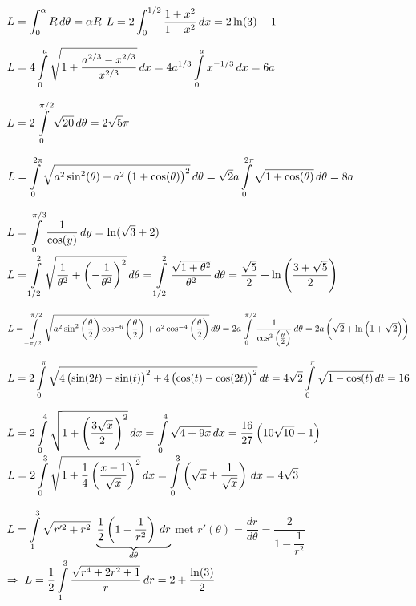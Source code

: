 \begin{Answer}
    
    \ifcalculus
    \Question $L = \displaystyle\int_0^{\alpha}R\,d\theta = \alpha R$ 
    \Question $L = \displaystyle 2\int_0^{1/2} \dfrac{1+x^2}{1-x^2}\, dx = 2\ln(3)-1$ 
    \fi
    
    \Question $L= 4 \displaystyle \int\limits_{0}^{a} \sqrt{1+ \dfrac{a^{2/3}-x^{2/3}}{x^{2/3}}} \, dx = 4a^{1/3} \displaystyle \int\limits_{0}^{a} x^{-1/3} \, dx   = 6a$
    
    \ifanalysis 
    \Question $L = 2 \displaystyle \int\limits_{0}^{\pi/2} \sqrt{20}\, d \theta = 2 \sqrt{5} \pi$ 
    \fi
    
    \Question $L = \displaystyle \int\limits_{0}^{2\pi} \sqrt{a^2 \sin^2 (\theta) + a^2 \left( 1+\cos(\theta) \right)^2}\, d \theta  = \sqrt{2} a \displaystyle \int\limits_{0}^{2 \pi} \sqrt{1+\cos(\theta)}\, d \theta= 8a $
    
    \Question  $L=\displaystyle \int\limits_{0}^{\pi/3} \dfrac{1}{\cos (y)} \, dy = \ln (\sqrt{3}+2)$
    \Question $L = \displaystyle \int \limits_{1/2}^2\sqrt{\dfrac{1}{\theta^2} + \left(-\dfrac{1}{\theta^2} \right)^2} \, d\theta  = \displaystyle \int \limits_{1/2}^2 \dfrac{\sqrt{1+\theta^2 }}{\theta^2}\, d\theta = \dfrac{\sqrt{5}}{2} + \ln  \left (\dfrac{3 + \sqrt{5}}{2} \right )$
    
    \ifanalysis
    \Question $L = \displaystyle \int\limits_{-\pi/2}^{\pi/2} \sqrt{a^2\sin^2\left(\frac{\theta}{2} \right) \cos^{-6}\left(\frac{\theta}{2} \right) + a^2 \cos^{-4}\left(\frac{\theta}{2} \right)}\, d \theta  = 2a \displaystyle \int\limits_{0}^{\pi/2} \dfrac{1}{\cos^3\left(\frac{\theta}{2} \right)}\, d \theta = 2 a \left(\sqrt{2} + \ln  \left(1 + \sqrt{2}\right)\right)  $
    \fi
    
    \Question $L= 2 \displaystyle \int\limits_{0}^{\pi} \sqrt{4 \left( \sin(2t)-\sin(t) \right)^2 + 4 \left( \cos(t)-\cos(2t) \right)^2} \, dt  = 4 \sqrt{2}\displaystyle \int\limits_{0}^{\pi} \sqrt{1-\cos (t)} \, dt = 16$
    
    \Question $L= 2 \displaystyle \int\limits_{0}^{4} \sqrt{1+\left( \dfrac{3\sqrt{x}}{2} \right)^2} \, dx  = \displaystyle \int\limits_{0}^{4} \sqrt{4+9x} \, dx = \dfrac{16}{27} \left(10 \sqrt{10}-1\right)$
    \Question $L= 2 \displaystyle \int\limits_{0}^{3} \sqrt{1+ \dfrac{1}{4}\left( \dfrac{x-1}{\sqrt{x}}\right)^2 } \, dx  = \displaystyle \int\limits_{0}^{3} \left(\sqrt{x} + \dfrac{1}{\sqrt{x}} \right) \, dx = 4\sqrt{3}$
    
    \ifanalysis
    
    \Question $L = \displaystyle \int \limits_{1}^{3} \sqrt{r'^2 + r^2}\  \underbrace{ \dfrac{1}{2}\left( 1 - \dfrac{1}{r^2} \right)\, dr}_{d\theta} $ \quad  met $r'(\theta) = \dfrac{dr}{d\theta} = \dfrac{2}{1 - \dfrac{1}{r^2}}$ \\[0.2cm]
    $\Rightarrow \; L= \dfrac{1}{2} \displaystyle \int \limits_{1}^{3} \dfrac{\sqrt{r^4 + 2r^2 + 1}}{r}\, dr =2+\dfrac{\ln(3) }{2}$
    
    \fi

\end{Answer}
	
